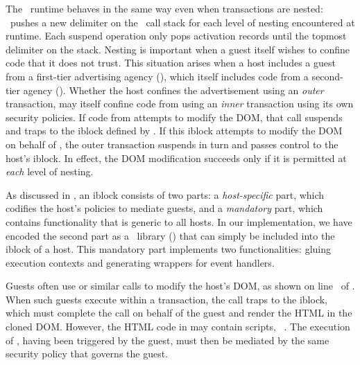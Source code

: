 The \txjs\ runtime behaves in the same way even when transactions are nested:
\txjs\ pushes a new delimiter on the \js\ call stack for each level of nesting
encountered at runtime. Each suspend operation only pops activation records
until the topmost delimiter on the stack.  Nesting is important when a guest
itself wishes to confine code that it does not trust. This situation arises
when a host includes a guest from a first-tier advertising agency
(), which itself includes code from a second-tier agency
(). Whether the host confines the advertisement using an
\textit{outer} transaction,  may itself confine code from
 using an \textit{inner} transaction using its own security
policies.  If code from  attempts to modify the DOM\@, that
call suspends and traps to the iblock defined by .  If this
iblock attempts to modify the DOM on behalf of , the outer
transaction suspends in turn and passes control to the host's iblock. In
effect, the DOM modification succeeds only if it is permitted at \textit{each}
level of nesting.

\label{section:design:iblock}

%
As discussed in , an iblock consists of two parts:
a \textit{host-specific} part, which codifies the host's policies to mediate
guests, and a \textit{mandatory} part, which contains functionality that is
generic to all hosts. In our implementation, we have encoded the second part as a
\js\ library () that can simply be included into the iblock
of a host. %
This mandatory part implements two functionalities: gluing execution contexts
and generating wrappers for event handlers.

\label{section:design:iblock:gluing}
%
Guests often use  or similar calls to modify the host's
DOM, as shown on line~ of .  When such guests
execute within a transaction, the  call traps to the
iblock, which must complete the call on behalf of the guest and render the
HTML in the cloned DOM\@. However, the HTML code in  may
contain scripts, \eg~. The
execution of , having been triggered by the guest, must then be
mediated by the same security policy that governs the guest. 

